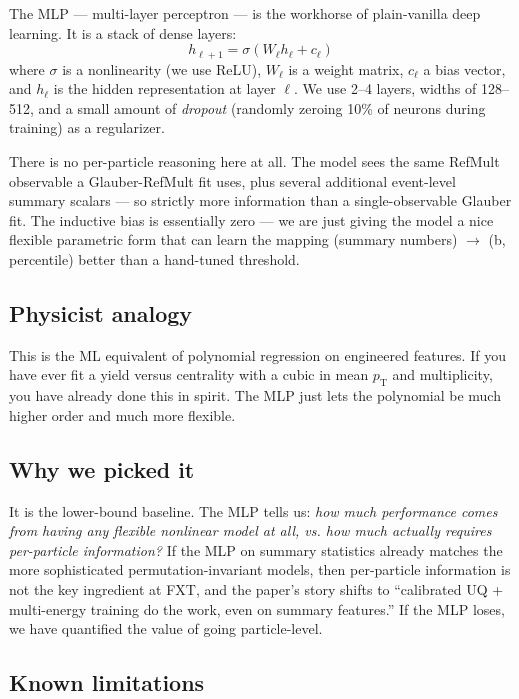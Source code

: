 \documentclass[11pt]{article}
\newcommand{\pT}{\ensuremath{p_{\text{T}}}}
\begin{document}
The MLP --- multi-layer perceptron --- is the workhorse of plain-vanilla
deep learning. It is a stack of dense layers:
\[
   h_{\ell+1} = \sigma(W_\ell h_\ell + c_\ell)
\]
where $\sigma$ is a nonlinearity (we use ReLU), $W_\ell$ is a weight
matrix, $c_\ell$ a bias vector, and $h_\ell$ is the hidden
representation at layer $\ell$. We use 2--4 layers, widths of
128--512, and a small amount of \emph{dropout} (randomly zeroing 10\%
of neurons during training) as a regularizer.

There is no per-particle reasoning here at all. The model sees the
same RefMult observable a Glauber-RefMult fit uses, plus several
additional event-level summary scalars --- so strictly more
information than a single-observable Glauber fit. The inductive bias
is essentially zero --- we are just
giving the model a nice flexible parametric form that can learn the
mapping (summary numbers) $\to$ (b, percentile) better than a
hand-tuned threshold.

\subsection{Physicist analogy}

This is the ML equivalent of polynomial regression on engineered
features. If you have ever fit a yield versus centrality with a
cubic in mean $\pT$ and multiplicity, you have already done this in
spirit. The MLP just lets the polynomial be much higher order and
much more flexible.

\subsection{Why we picked it}

It is the lower-bound baseline. The MLP tells us: \emph{how much
performance comes from having any flexible nonlinear model at all,
vs. how much actually requires per-particle information?} If the MLP
on summary statistics already matches the more sophisticated
permutation-invariant models, then per-particle information is not
the key ingredient at FXT, and the paper's story shifts to
``calibrated UQ + multi-energy training do the work, even on summary
features.'' If the MLP loses, we have quantified the value of going
particle-level.

\subsection{Known limitations}
\end{document}
